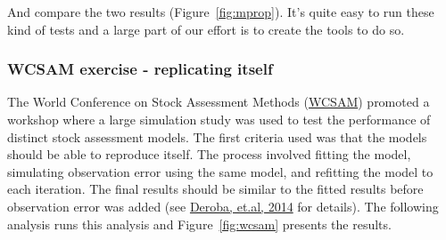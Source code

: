 \documentclass[a4paper,english,10pt]{article}\usepackage[]{graphicx}\usepackage[]{color}
\makeatletter
\newenvironment{kframe}{%
 \def\at@end@of@kframe{}%
 \ifinner\ifhmode%
  \def\at@end@of@kframe{\end{minipage}}%
  \begin{minipage}{\columnwidth}%
 \fi\fi%
 \def\FrameCommand##1{\hskip\@totalleftmargin \hskip-\fboxsep
 \colorbox{shadecolor}{##1}\hskip-\fboxsep
     \hskip-\linewidth \hskip-\@totalleftmargin \hskip\columnwidth}%
 \MakeFramed {\advance\hsize-\width
   \@totalleftmargin\z@ \linewidth\hsize
   \@setminipage}}%
 {\par\unskip\endMakeFramed%
 \at@end@of@kframe}
\newenvironment{knitrout}{}{} %
\makeatother
\begin{document}
And compare the two results (Figure~\ref{fig:mprop}). It's quite easy to run these kind of tests and a large part of our effort is to create the tools to do so. 

\begin{knitrout}
\color{fgcolor}\begin{kframe}


{\ttfamily\noindent\bfseries{}}\end{kframe}
\end{knitrout}



\subsubsection{WCSAM exercise - replicating itself}

The World Conference on Stock Assessment Methods (\href{http://www.ices.dk/news-and-events/symposia/WCSAM-2013}{WCSAM}) promoted a workshop where a large simulation study was used to test the performance of distinct stock assessment models. The first criteria used was that the models should be able to reproduce itself. The process involved fitting the model, simulating observation error using the same model, and refitting the model to each iteration. The final results should be similar to the fitted results before observation error was added (see \href{http://icesjms.oxfordjournals.org/content/early/2014/01/18/icesjms.fst237.abstract}{Deroba, et.al, 2014} for details). The following analysis runs this analysis and Figure~\ref{fig:wcsam} presents the results.
\end{document}
